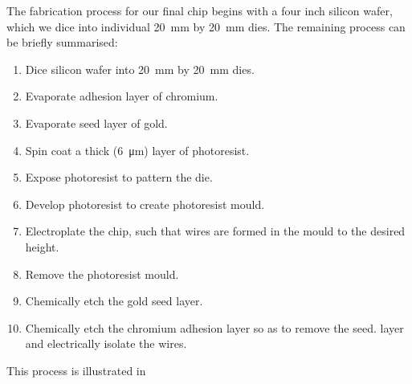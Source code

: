 The fabrication process for our final chip begins with a four inch silicon
wafer, which we dice into individual \SI{20}{\milli\meter} by
\SI{20}{\milli\meter} dies. The remaining process can be briefly summarised:
\begin{enumerate}
  \item Dice silicon wafer into \SI{20}{\milli\meter} by \SI{20}{\milli\meter}
    dies.
  \item Evaporate adhesion layer of chromium.
  \item Evaporate seed layer of gold.
  \item Spin coat a thick (\SI{6}{\micro\meter}) layer of photoresist.
  \item Expose photoresist to pattern the die.
  \item Develop photoresist to create photoresist mould.
  \item Electroplate the chip, such that wires are formed in the mould to the
    desired height.
  \item Remove the photoresist mould.
  \item Chemically etch the gold seed layer.
  \item Chemically etch the chromium adhesion layer so as to remove the seed.
    layer and electrically isolate the wires.
\end{enumerate}
This process is illustrated in 


